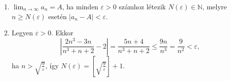 \documentclass[11pt]{scrartcl}
\begin{document}
\begin{enumerate}
	\item $\lim_{n \to \infty} a_n = A$, ha minden $\varepsilon > 0$ számhoz
	      létezik $N(\varepsilon) \in \mathbb{N}$, melyre $n \ge N(\varepsilon)$
	      esetén $|a_n - A| < \varepsilon$.

	\item Legyen $\varepsilon > 0$. Ekkor
	      \[
		      \left| \frac{2n^3 - 3n}{n^3 + n + 2} - 2 \right|
		      = \frac{5n + 4}{n^3 + n + 2}
		      \le \frac{9n}{n^3}
		      = \frac{9}{n^2}
		      < \varepsilon,
	      \]
	      ha \(n > \sqrt{\frac{9}{\varepsilon}}\), így
	      \(
	      N(\varepsilon) = \left[ \sqrt{\frac{9}{\varepsilon}} \right] + 1
	      \).
\end{enumerate}
\end{document}

